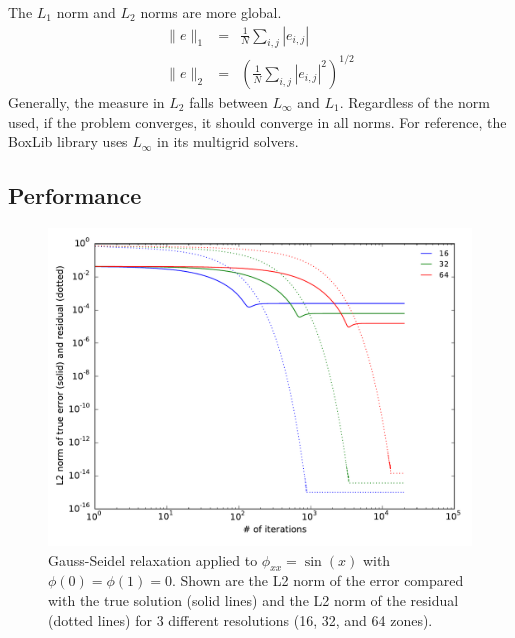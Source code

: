 The $L_1$ norm and $L_2$ norms are more global. 
\begin{eqnarray}
\|e\|_1 &=& \frac{1}{N} \sum_{i,j} |e_{i,j} | \\
\|e\|_2 &=& \left ( \frac{1}{N} \sum_{i,j} |e_{i,j} |^2 \right )^{1/2}
\end{eqnarray}
Generally, the measure in $L_2$ falls between $L_\infty$ and $L_1$.
Regardless of the norm used, if the problem converges, it should
converge in all norms.  
For reference, the BoxLib library uses $L_\infty$ in its multigrid solvers.



\subsection{Performance}


\begin{figure}
\centering
\includegraphics[width=\linewidth]{smooth-error}
\caption[Convergence as a function of number of iterations using Gauss-Seidel relaxation]{\label{fig:smootherror} Gauss-Seidel relaxation applied to
  $\phi_{xx} = \sin(x)$ with $\phi(0) = \phi(1) = 0$.  Shown are the
  L2 norm of the error compared with the true solution (solid lines)
  and the L2 norm of the residual (dotted lines) for 3 different
  resolutions (16, 32, and 64 zones). \\
  }
\end{figure}

